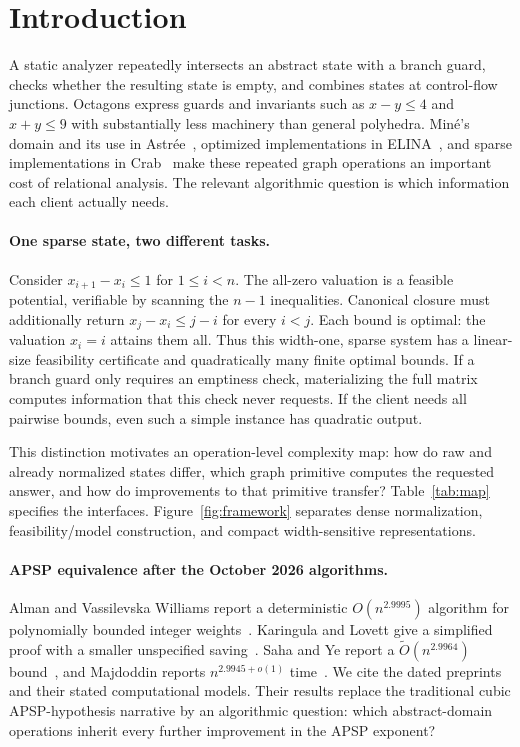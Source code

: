 \documentclass[manuscript,11pt,screen,nonacm]{acmart}
\theoremstyle{definition}
\begin{document}
\section{Introduction}
A static analyzer repeatedly intersects an abstract state with a branch guard, checks whether the resulting state is empty, and combines states at control-flow junctions. Octagons express guards and invariants such as $x-y\leq4$ and $x+y\leq9$ with substantially less machinery than general polyhedra. Min\'e's domain and its use in Astr\'ee~\cite{mine2006}, optimized implementations in ELINA~\cite{spv2015}, and sparse implementations in Crab~\cite{gange2021} make these repeated graph operations an important cost of relational analysis. The relevant algorithmic question is which information each client actually needs.

\paragraph{One sparse state, two different tasks.}
Consider $x_{i+1}-x_i\leq1$ for $1\leq i<n$. The all-zero valuation is a feasible potential, verifiable by scanning the $n-1$ inequalities. Canonical closure must additionally return $x_j-x_i\leq j-i$ for every $i<j$. Each bound is optimal: the valuation $x_i=i$ attains them all. Thus this width-one, sparse system has a linear-size feasibility certificate and quadratically many finite optimal bounds. If a branch guard only requires an emptiness check, materializing the full matrix computes information that this check never requests. If the client needs all pairwise bounds, even such a simple instance has quadratic output.

This distinction motivates an operation-level complexity map: how do raw and already normalized states differ, which graph primitive computes the requested answer, and how do improvements to that primitive transfer? Table~\ref{tab:map} specifies the interfaces. Figure~\ref{fig:framework} separates dense normalization, feasibility/model construction, and compact width-sensitive representations.

\paragraph{APSP equivalence after the October 2026 algorithms.}
Alman and Vassilevska Williams report a deterministic $O(n^{2.9995})$ algorithm for polynomially bounded integer weights~\cite[Theorem 2]{alman2026}. Karingula and Lovett give a simplified proof with a smaller unspecified saving~\cite[Corollary 1.2]{karingula2026}. Saha and Ye report a $\widetilde O(n^{2.9964})$ bound~\cite[Theorem 1.3]{saha2026}, and Majdoddin reports $n^{2.9945+o(1)}$ time~\cite[Corollary D]{majdoddin2026}. We cite the dated preprints and their stated computational models. Their results replace the traditional cubic APSP-hypothesis narrative by an algorithmic question: which abstract-domain operations inherit every further improvement in the APSP exponent?
\end{document}
